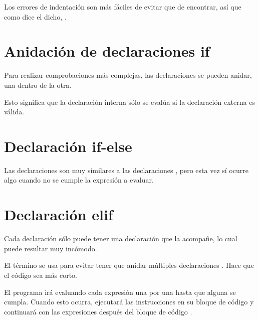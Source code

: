 Los errores de indentación son más fáciles de evitar que de encontrar, así que como dice el dicho, .

\section{Anidación de declaraciones if}

Para realizar comprobaciones más complejas, las declaraciones  se pueden anidar, una dentro de la otra.\smallskip

Esto significa que la declaración  interna sólo se evalúa si la declaración  externa es válida.


\section{Declaración if-else}

Las declaraciones  son muy similares a las declaraciones , pero esta vez sí ocurre algo cuando no se cumple la expresión a evaluar.



\section{Declaración elif}

Cada declaración  sólo puede tener una declaración  que la acompañe, lo cual puede resultar muy incómodo.


El término  se usa para evitar tener que anidar múltiples declaraciones . Hace que el código sea más corto.


El programa irá evaluando cada expresión una por una hasta que alguna se cumpla. Cuando esto ocurra, ejecutará las instrucciones en su bloque de código y continuará con las expresiones después del bloque de código .

